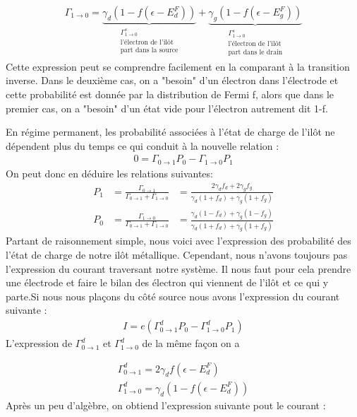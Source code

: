 \begin{eqnarray}
\Gamma_{1 \rightarrow 0} = 
\underbrace{\gamma_d (1 - f(\epsilon - E_d^F))}_{\substack{{\Gamma_{1 \rightarrow 0}^s}\\\text{l'électron de l'il\^ot}\\\text{part dans la source}}}
+ 
\underbrace{\gamma_g (1 - f(\epsilon - E_g^F))}_{\substack{{\Gamma_{1 \rightarrow 0}^s}\\\text{l'électron de l'il\^ot}\\\text{part dans le drain}}}
\end{eqnarray}
Cette expression peut se comprendre facilement en la comparant à la transition inverse. Dans le deuxième cas, on a "besoin" d'un électron dans l'électrode et cette probabilité est donnée par la distribution de Fermi f, alors que dans le premier cas, on a "besoin" d'un état vide pour l'électron autrement dit 1-f.

En régime permanent, les probabilité associées à l'état de charge de l'il\^ot ne dépendent plus du temps ce qui conduit à la nouvelle relation :
\begin{eqnarray}
0 = \Gamma_{0 \rightarrow 1}P_0 - \Gamma_{1 \rightarrow 0}P_1
\end{eqnarray}
On peut donc en déduire les relations suivantes:
\begin{eqnarray}
P_1 &= \frac{\Gamma_{0 \rightarrow 1}}{\Gamma_{0 \rightarrow 1} + \Gamma_{1 \rightarrow 0}} &= \frac{2\gamma_d f_d + 2 \gamma_g f_g}{\gamma_d(1+f_d) + \gamma_g(1 + f_g)} \\
P_0 &= \frac{\Gamma_{1 \rightarrow 0}}{\Gamma_{0 \rightarrow 1} + \Gamma_{1 \rightarrow 0}} &= \frac{\gamma_d(1-f_d) + \gamma_g(1 - f_g)}{\gamma_d(1+f_d) + \gamma_g(1 + f_g)}
\end{eqnarray}
Partant de raisonnement simple, nous voici avec l'expression des probabilité des l'état de charge de notre il\^ot métallique. Cependant, nous n'avons toujours pas l'expression du courant traversant notre système. Il nous faut pour cela prendre une électrode et faire le bilan des électron qui viennent de l'il\^ot et ce qui y parte.Si nous nous plaçons du c\^oté source nous avons l'expression du courant suivante :
\begin{eqnarray}
I = e (\Gamma_{0 \rightarrow 1}^d P_0 - \Gamma_{1 \rightarrow 0}^d P_1)
\end{eqnarray}
L'expression de $\Gamma_{0 \rightarrow 1}^d$ et $\Gamma_{1 \rightarrow 0}^d$ de la m\^eme façon on a 
 
\begin{eqnarray}
\Gamma_{0 \rightarrow 1}^d =  2\gamma_d f(\epsilon - E_d^F)\\
\Gamma_{1 \rightarrow 0}^d = \gamma_d (1- f(\epsilon - E_d^F)) 
\end{eqnarray}
Après un peu d'algèbre, on obtiend l'expression suivante pout le courant :

